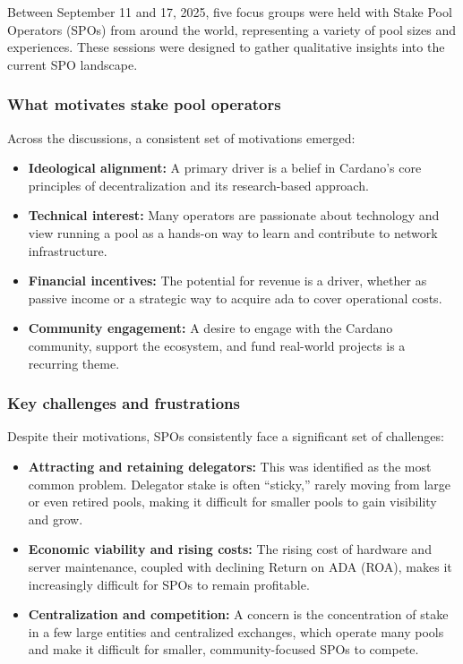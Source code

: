 \documentclass[11pt, letterpaper]{article}
\begin{document}
Between September 11 and 17, 2025, five focus groups were held with Stake Pool
Operators (SPOs) from around the world, representing a variety of pool sizes
and experiences. These sessions were designed to gather qualitative insights
into the current SPO landscape.

\subsubsection{What motivates stake pool operators}
Across the discussions, a consistent set of motivations emerged:
\begin{itemize}
	\item \textbf{Ideological alignment:} A primary driver is a belief in Cardano's core principles of
	      decentralization and its research-based approach.
	\item \textbf{Technical interest:} Many operators are passionate about technology and view running a pool
	      as a hands-on way to learn and contribute to network infrastructure.
	\item \textbf{Financial incentives:} The potential for revenue is a driver, whether as passive income or a
	      strategic way to acquire ada to cover operational costs.
	\item \textbf{Community engagement:} A desire to engage with the Cardano community, support the ecosystem,
	      and fund real-world projects is a recurring theme.
\end{itemize}

\subsubsection{Key challenges and frustrations}
Despite their motivations, SPOs consistently face a significant set of
challenges:
\begin{itemize}
	\item \textbf{Attracting and retaining delegators:} This was identified as the most common problem.
	      Delegator stake is often ``sticky,'' rarely moving from large or even retired pools, making it difficult
	      for smaller pools to gain visibility and grow.
	\item \textbf{Economic viability and rising costs:} The rising cost of hardware and server maintenance,
	      coupled with declining Return on ADA (ROA), makes it increasingly difficult for SPOs to remain profitable.
	\item \textbf{Centralization and competition:} A concern is the concentration of stake in a few large
	      entities and centralized exchanges, which operate many pools and make it difficult for smaller,
	      community-focused SPOs to compete.
\end{itemize}
\end{document}

